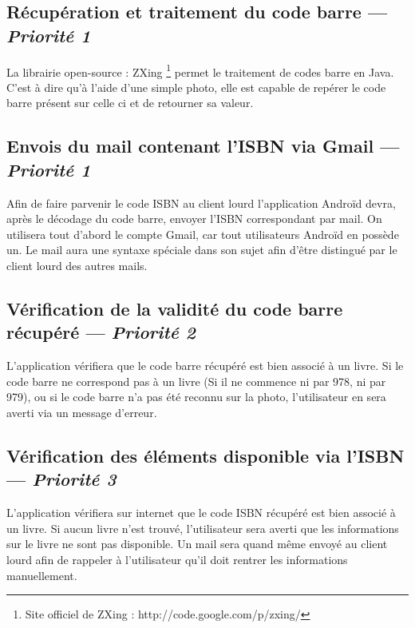 \subsection[Récupération et traitement du code barre]{Récupération et traitement du code barre — \emph{Priorité 1}}
La librairie open-source : ZXing \footnote{Site officiel de ZXing : http://code.google.com/p/zxing/} 
permet le traitement de codes barre en Java. 
C'est à dire qu'à l'aide d'une simple photo, elle est capable de repérer le code barre présent sur celle ci et de retourner sa valeur.

\subsection[Envois du mail contenant l'ISBN via Gmail]{Envois du mail contenant l'ISBN via Gmail — \emph{Priorité 1}}
Afin de faire parvenir le code ISBN au client lourd l'application Androïd devra, après le décodage du code barre, envoyer l'ISBN correspondant par mail. 
On utilisera tout d'abord le compte Gmail, car tout utilisateurs Androïd en possède un. 
Le mail aura une syntaxe spéciale dans son sujet afin d'être distingué par le client lourd des autres mails.


\subsection[Vérification de la validité du code barre récupéré]{Vérification de la validité du code barre récupéré — \emph{Priorité 2}}
L'application vérifiera que le code barre récupéré est bien associé à un livre. 
Si le code barre ne correspond pas à un livre (Si il ne commence ni par 978, ni par 979), ou si le code barre n'a pas été reconnu sur la photo, l'utilisateur en sera averti via un message d'erreur.


\subsection[Vérification des éléments disponible via l'ISBN]{Vérification des éléments disponible via l'ISBN — \emph{Priorité 3}}
L'application vérifiera sur internet que le code ISBN récupéré est bien associé à un livre.
Si aucun livre n'est trouvé, l'utilisateur sera averti que les informations sur le livre ne sont pas disponible. 
Un mail sera quand même envoyé au client lourd afin de rappeler à l'utilisateur qu'il doit rentrer les informations manuellement.
 
